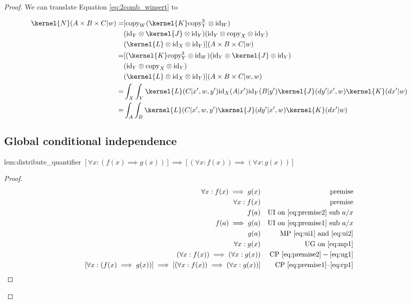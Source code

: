 \begin{proof}
We can translate Equation \ref{eq:2comb_winsert} to

\begin{align}
    \kernel{N}(A\times B\times C|w) = &[\text{copy}_W(\kernel{K}\text{copy}^3_Y\otimes \text{id}_W)\\
    &(\text{id}_Y\otimes\kernel{J}\otimes \text{id}_Y)(\text{id}_Y \otimes \text{copy}_X\otimes \text{id}_Y)\\
    &(\kernel{L}\otimes \text{id}_X\otimes \text{id}_Y)] (A\times B\times C|w)\\
                    = &[(\kernel{K}\text{copy}^3_Y\otimes \text{id}_W)(\text{id}_Y\otimes\kernel{J}\otimes \text{id}_Y)\\
                    &(\text{id}_Y \otimes \text{copy}_X\otimes \text{id}_Y)\\
                    &(\kernel{L}\otimes \text{id}_X\otimes \text{id}_Y)] (A\times B\times C|w,w)\\
                    = &\int_X\int_Y\kernel{L}(C|x',w,y') \text{id}_X(A|x') \text{id}_Y(B|y') \kernel{J}(dy'|x',w)\kernel{K}(dx'|w)\\
                    = &\int_A\int_B\kernel{L}(C|x',w,y') \kernel{J}(dy'|x',w)\kernel{K}(dx'|w)
\end{align}


\subsection{Global conditional independence}

\begin{reptheorem}{lem:distribute_quantifier}
$[\forall x: (f(x)\implies g(x))]\implies[(\forall x: f(x))\implies(\forall x: g(x))]$
\end{reptheorem}

\begin{proof}
\begin{align}
    \forall x: f(x) \implies g(x)&&\text{premise}\label{eq:premise1}\\
    \forall x: f(x)&& \text{premise}\label{eq:premise2}\\
    f(a) && \text{UI on }\ref{eq:premise2}\text{ sub }a/x\label{eq:ui1}\\
    f(a)\implies g(a) && \text{UI on }\ref{eq:premise1}\text{ sub }a/x\label{eq:ui2}\\
    g(a)&&\text{ MP }\ref{eq:ui1}\text{ and }\ref{eq:ui2}\label{eq:mp1}\\
    \forall x: g(x)&&\text{UG on }\ref{eq:mp1}\label{eq:ug1}\\
    (\forall x: f(x))\implies(\forall x: g(x))&& \text{CP }\ref{eq:premise2}-\ref{eq:ug1}\label{eq:cp1}\\
    [\forall x: (f(x)\implies g(x))]\implies[(\forall x: f(x))\implies(\forall x: g(x))]&& \text{CP }\ref{eq:premise1}\text{--}\ref{eq:cp1}
\end{align}


\end{proof}
\end{proof}
